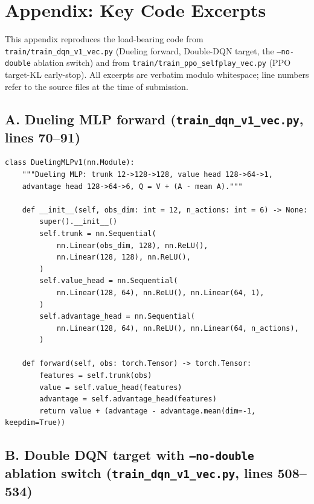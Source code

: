 \section{Appendix: Key Code Excerpts}
\label{sec:appendix}

This appendix reproduces the load-bearing code from
\texttt{train/train\_dqn\_v1\_vec.py} (Dueling forward, Double-DQN target,
the \texttt{--no-double} ablation switch) and from
\texttt{train/train\_ppo\_selfplay\_vec.py} (PPO target-KL early-stop). All
excerpts are verbatim modulo whitespace; line numbers refer to the source
files at the time of submission.

\subsection*{A. Dueling MLP forward (\texttt{train\_dqn\_v1\_vec.py}, lines 70--91)}

\begin{lstlisting}
class DuelingMLPv1(nn.Module):
    """Dueling MLP: trunk 12->128->128, value head 128->64->1,
    advantage head 128->64->6, Q = V + (A - mean A)."""

    def __init__(self, obs_dim: int = 12, n_actions: int = 6) -> None:
        super().__init__()
        self.trunk = nn.Sequential(
            nn.Linear(obs_dim, 128), nn.ReLU(),
            nn.Linear(128, 128), nn.ReLU(),
        )
        self.value_head = nn.Sequential(
            nn.Linear(128, 64), nn.ReLU(), nn.Linear(64, 1),
        )
        self.advantage_head = nn.Sequential(
            nn.Linear(128, 64), nn.ReLU(), nn.Linear(64, n_actions),
        )

    def forward(self, obs: torch.Tensor) -> torch.Tensor:
        features = self.trunk(obs)
        value = self.value_head(features)
        advantage = self.advantage_head(features)
        return value + (advantage - advantage.mean(dim=-1, keepdim=True))
\end{lstlisting}

\subsection*{B. Double DQN target with \texttt{--no-double} ablation switch
(\texttt{train\_dqn\_v1\_vec.py}, lines 508--534)}

